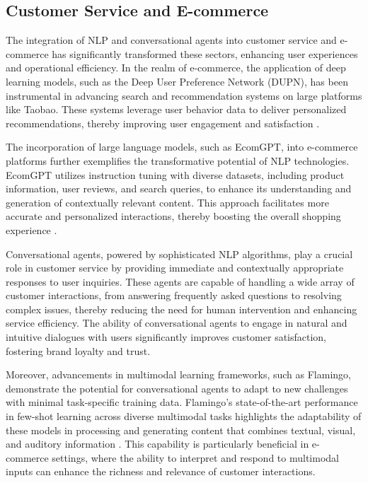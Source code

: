 \subsection{Customer Service and E-commerce} \label{subsec:Customer Service and E-commerce}

The integration of NLP and conversational agents into customer service and e-commerce has significantly transformed these sectors, enhancing user experiences and operational efficiency. In the realm of e-commerce, the application of deep learning models, such as the Deep User Preference Network (DUPN), has been instrumental in advancing search and recommendation systems on large platforms like Taobao. These systems leverage user behavior data to deliver personalized recommendations, thereby improving user engagement and satisfaction \cite{ni2018perceiveusersdepthlearning}.



The incorporation of large language models, such as EcomGPT, into e-commerce platforms further exemplifies the transformative potential of NLP technologies. EcomGPT utilizes instruction tuning with diverse datasets, including product information, user reviews, and search queries, to enhance its understanding and generation of contextually relevant content. This approach facilitates more accurate and personalized interactions, thereby boosting the overall shopping experience \cite{li2023ecomgptinstructiontuninglargelanguage}.



Conversational agents, powered by sophisticated NLP algorithms, play a crucial role in customer service by providing immediate and contextually appropriate responses to user inquiries. These agents are capable of handling a wide array of customer interactions, from answering frequently asked questions to resolving complex issues, thereby reducing the need for human intervention and enhancing service efficiency. The ability of conversational agents to engage in natural and intuitive dialogues with users significantly improves customer satisfaction, fostering brand loyalty and trust.



Moreover, advancements in multimodal learning frameworks, such as Flamingo, demonstrate the potential for conversational agents to adapt to new challenges with minimal task-specific training data. Flamingo's state-of-the-art performance in few-shot learning across diverse multimodal tasks highlights the adaptability of these models in processing and generating content that combines textual, visual, and auditory information \cite{alayrac2022flamingo}. This capability is particularly beneficial in e-commerce settings, where the ability to interpret and respond to multimodal inputs can enhance the richness and relevance of customer interactions.



